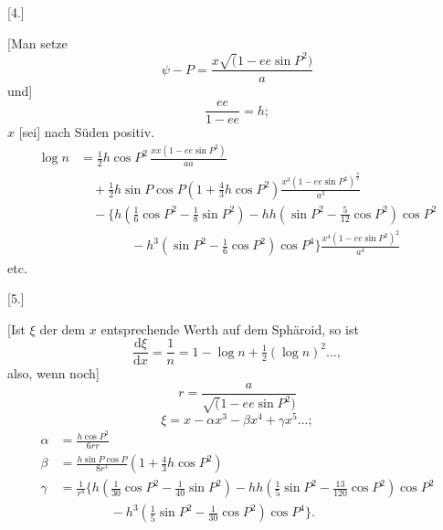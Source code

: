 \par\clearpage
\noindent\makebox[12mm][l]{}\par\medskip

\begin{center}[4.]\end{center}
[Man setze
\[
\psi-P=\frac{x\surd(1-ee\sin P^2)}a
\]
\noindent und]
\[
\frac{ee}{1-ee}=h;
\]
\noindent \(x\) [sei] nach Süden positiv.
\[
\begin{aligned}
\log n&=\tfrac12h\cos P^2\,\frac{xx(1-ee\sin P^2)}{aa}\\
&\quad+\tfrac12h\sin P\cos P(1+\tfrac43h\cos P^2)
\frac{x^3(1-ee\sin P^2)^{\frac32}}{a^3}\\
&\quad-\{h(\tfrac16\cos P^2-\tfrac18\sin P^2)
-hh(\sin P^2-\tfrac5{12}\cos P^2)\cos P^2\\
&\qquad\qquad-h^3(\sin P^2-\tfrac16\cos P^2)\cos P^4\}
\frac{x^4(1-ee\sin P^2)^2}{a^4}
\end{aligned}
\]
\noindent\hfill etc.\hfill\null\par

\bigskip
\begin{center}[5.]\end{center}
[Ist \(\xi\) der dem \(x\) entsprechende Werth auf dem Sphäroid, so ist
\[
\frac{\mathrm d\xi}{\mathrm dx}=\frac1n=1-\log n+\tfrac12(\log n)^2\ldots,
\]
\noindent also, wenn noch]
\[
r=\frac a{\surd(1-ee\sin P^2)}
\]
\[
\xi=x-\alpha x^3-\beta x^4+\gamma x^5\ldots;
\]
\[
\begin{aligned}
\alpha&=\frac{h\cos P^2}{6rr}\\
\beta&=\frac{h\sin P\cos P}{8r^3}(1+\tfrac43h\cos P^2)\\
\gamma&=\frac1{r^4}\{h(\tfrac1{30}\cos P^2-\tfrac1{40}\sin P^2)
-hh(\tfrac15\sin P^2-\tfrac{13}{120}\cos P^2)\cos P^2\\
&\qquad\qquad-h^3(\tfrac15\sin P^2-\tfrac1{30}\cos P^2)\cos P^4\}.
\end{aligned}
\]
\par
\endgroup
